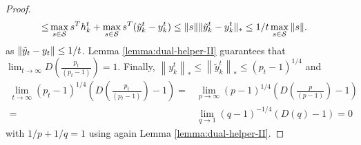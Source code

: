 \begin{proof}
{\begin{align*}
      \leq & \max_{s\in \mathcal{S}} s^Th^t_{k}+\max_{s\in \mathcal{S}} s^T(\tilde y^t_k-y_k^t)\leq \| s \|\| \tilde y^t_k-y_k^t \|_* \leq 1/t \max_{s\in \mathcal{S}} \| s \| .
    \end{align*}
    as $\| \tilde y_t-y_t \|\leq 1/t$.
  }
  Lemma \ref{lemma:dual-helper-II} guarantees that $\lim_{t\to\infty} D\left(\tfrac{p_t}{(p_t-1)}\right)=1$.
  Finally, $\left\|y^t_{k} \right\|_*\leq \left\|\tilde y^t_{k} \right\|_*\leq (p_t-1)^{1/4}$ and
  \begin{align*}
    \lim_{t\to\infty} (p_t-1)^{1/4} \left(D\left(\tfrac{p_t}{(p_t-1)}\right)-1\right)=& \lim_{p\to\infty} (p-1)^{1/4} \left(D\left(\tfrac{p}{(p-1)}\right)-1\right)\\
    = & \lim_{q\to 1} (q-1)^{-1/4} \left( D(q)-1 \right)=0
  \end{align*}
  with $1/p+1/q=1$ using again Lemma \ref{lemma:dual-helper-II}.
\end{proof}

